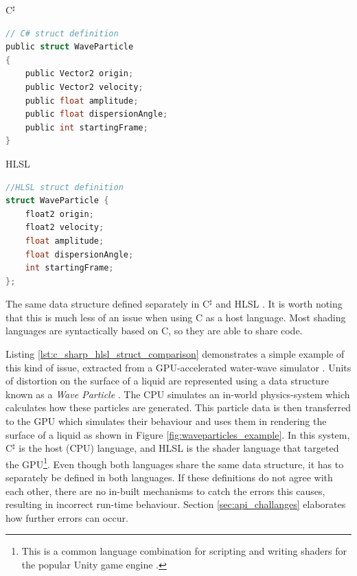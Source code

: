 \documentclass[a4paper,12pt,twoside,openright]{report}
\begin{document}
\begin{lstfloat}
\begin{center} C$^\sharp$ \end{center}
\begin{lstlisting}[language=C]
// C# struct definition
public struct WaveParticle
{
    public Vector2 origin;
    public Vector2 velocity;
    public float amplitude;
    public float dispersionAngle;
    public int startingFrame;
}
\end{lstlisting}
\begin{center} HLSL \end{center}
\begin{lstlisting}[language=C]
//HLSL struct definition
struct WaveParticle {
    float2 origin;
    float2 velocity;
    float amplitude;
    float dispersionAngle;
    int startingFrame;
};
\end{lstlisting}
\caption{The same data structure defined separately in C$^\sharp$ and HLSL
\cite{WaveParticlesGPU}. It is worth noting that this is much less of an issue
when using C as a host language. Most shading languages are
syntactically based on C, so they are able to share code.}
\label{lst:c_sharp_hlsl_struct_comparison}
\end{lstfloat}

Listing \ref{lst:c_sharp_hlsl_struct_comparison} demonstrates a simple example
of this kind of issue, extracted from a GPU-accelerated water-wave simulator
\cite{WaveParticlesGPU}. Units of distortion on the surface of a liquid are
represented using a data structure known as a \textit{Wave Particle}
\cite{WaveParticlesOriginalPaper}. The CPU simulates an in-world physics-system
which calculates how these particles are generated. This particle data is then
transferred to the GPU which simulates their behaviour and uses them in
rendering the surface of a liquid as shown in Figure
\ref{fig:waveparticles_example}. In this system, C$^\sharp$ is the host (CPU)
language, and HLSL is the shader language that targeted the GPU\footnote{This
is a common language combination for scripting and writing shaders for the
popular Unity game engine\cite{UnityScripting} \cite{UnityShaders}.}. Even
though both languages share the same data structure, it has to separately be
defined in both languages. If these definitions do not agree with each other,
there are no in-built mechanisms to catch the errors this causes, resulting in
incorrect run-time behaviour. Section \ref{sec:api_challanges} elaborates how
further errors can occur.
\end{document}
